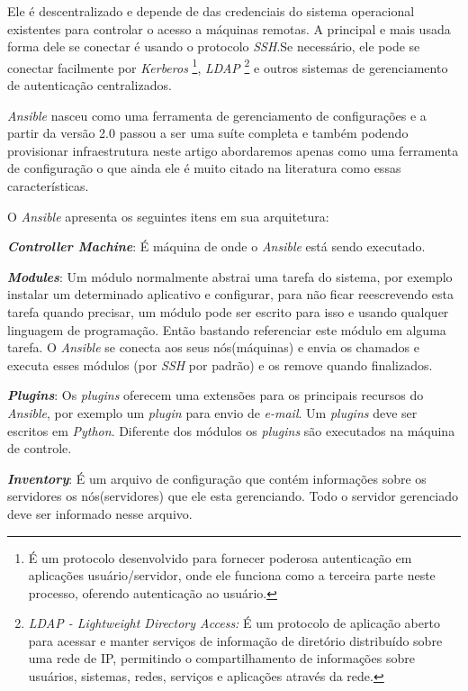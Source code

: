 Ele é descentralizado e depende de das credenciais do sistema operacional existentes para controlar o acesso a máquinas remotas. A principal e mais usada forma dele se conectar é usando o protocolo \textit{SSH}.Se necessário, ele pode se conectar facilmente por \textit{Kerberos} \footnote{É um protocolo desenvolvido para fornecer poderosa autenticação em aplicações usuário/servidor, onde ele funciona como a terceira parte neste processo, oferendo autenticação ao usuário.}, \textit{LDAP} \footnote{\textit{LDAP - Lightweight Directory Access:} É um protocolo de aplicação aberto para acessar e manter serviços de informação de diretório distribuído sobre uma rede de IP, permitindo o compartilhamento de informações sobre usuários, sistemas, redes, serviços e aplicações através da rede.} e outros sistemas de gerenciamento de autenticação centralizados.


\textit{Ansible} nasceu como uma ferramenta de gerenciamento de configurações e a partir da versão 2.0 passou a ser uma suíte completa e também podendo provisionar infraestrutura neste artigo abordaremos apenas como uma ferramenta de configuração o que ainda ele é muito citado na literatura como essas características.

 O \textit{Ansible} apresenta os seguintes itens em sua arquitetura:

\hfill

\textbf{\textit{Controller Machine}}: É máquina de onde o \textit{Ansible} está sendo executado. 

\textbf{\textit{Modules}}: Um módulo normalmente abstrai uma tarefa do sistema, por exemplo instalar um determinado aplicativo e configurar, para não ficar reescrevendo esta tarefa quando precisar, um módulo pode ser escrito para isso e usando qualquer linguagem de programação. Então bastando referenciar este módulo em alguma tarefa. O \textit{Ansible} se conecta aos seus nós(máquinas) e envia os chamados e executa esses módulos (por \textit{SSH} por padrão) e os remove quando finalizados.   

\textbf{\textit{Plugins}}: Os \textit{plugins} oferecem uma extensões para os principais recursos do \textit{Ansible}, por exemplo um \textit{plugin} para envio de \textit{e-mail}. Um \textit{plugins} deve ser escritos em \textit{Python}. Diferente dos módulos os \textit{plugins} são executados na máquina de controle.

\textbf{\textit{Inventory}}: É um arquivo de configuração que contém informações sobre os servidores os nós(servidores) que ele esta gerenciando. Todo o servidor gerenciado deve ser informado nesse arquivo.

